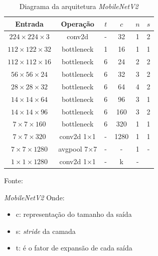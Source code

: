 \begin{frame}[plain]
    \begin{table}
        \centering
        \caption{Diagrama da arquitetura \textit{MobileNetV2}}
        \vspace{0pt}
        \begin{tabular}{c|c|c|c|c|c}
        \hline
        Entrada & Operação & $t$& $c$ & $n$ & $s$ \\
        \hline
            $224\times224\times3$ & conv2d & - & 32 & 1 & 2\\
            $112\times122\times32$ & bottleneck & 1 & 16 & 1 & 1 \\
            $112\times112\times16$ & bottleneck & 6 & 24 & 2 & 2 \\
            $56\times56\times24$ & bottleneck & 6 & 32 & 3 & 2 \\
            $28\times28\times32$ & bottleneck & 6 & 64 & 4 & 2 \\
            $14\times14\times64$ & bottleneck & 6 & 96 & 3 & 1 \\
            $14\times14\times96$ & bottleneck & 6 & 160 & 3 & 2 \\
            $7\times7\times160$ & bottleneck & 6 & 320 & 1 & 1 \\
            $7\times7\times320$ & conv2d 1$\times$1 & - & 1280 & 1 & 1 \\
            $7\times7\times1280$ & avgpool 7$\times$7 & - & - & 1 & - \\ 
            $1\times1\times1280$ & conv2d 1$\times$1 & - & k & -& \\
        \hline
        \end{tabular}
            \begin{center}
                {\footnotesize Fonte: \textcite[tradução pelo autor]{sandler2019mobilenetv2invertedresidualslinear}}
            \end{center}
        \label{tab:mobilenetarch}
        \end{table}
\end{frame}

\begin{frame}{\textit{MobileNetV2}}
    Onde:
    \begin{itemize}
        \item c: representação do tamanho da saída 
        \item s: \textit{stride} da camada
        \item t: é o fator de expansão de cada saída
    \end{itemize}
\end{frame}